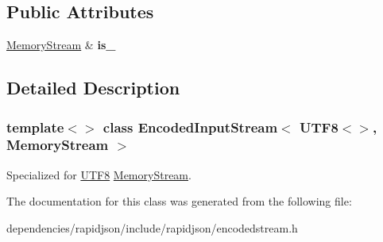 \subsection*{Public Attributes}
\begin{DoxyCompactItemize}
\item 
\mbox{\label{class_encoded_input_stream_3_01_u_t_f8_3_4_00_01_memory_stream_01_4_ad5e48564bbd14297a4cc445af3a4aa83}} 
\hyperlink{struct_memory_stream}{Memory\+Stream} \& {\bfseries is\+\_\+}
\end{DoxyCompactItemize}


\subsection{Detailed Description}
\subsubsection*{template$<$$>$\newline
class Encoded\+Input\+Stream$<$ U\+T\+F8$<$$>$, Memory\+Stream $>$}

Specialized for \hyperlink{struct_u_t_f8}{U\+T\+F8} \hyperlink{struct_memory_stream}{Memory\+Stream}. 

The documentation for this class was generated from the following file\+:\begin{DoxyCompactItemize}
\item 
dependencies/rapidjson/include/rapidjson/encodedstream.\+h\end{DoxyCompactItemize}
